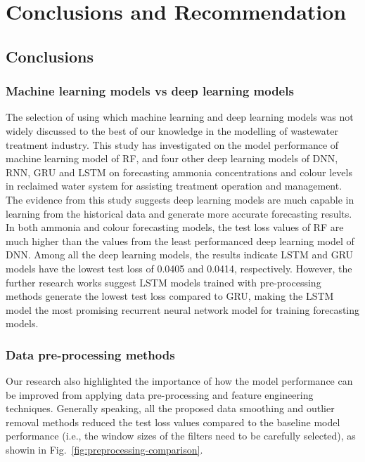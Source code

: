 \chapter{Conclusions and Recommendation}
\section{Conclusions}
\subsection{Machine learning models vs deep learning models}
The selection of using which machine learning and deep learning models was not widely discussed to the best of our knowledge in the modelling of wastewater treatment industry. This study has investigated on the model performance of machine learning model of RF, and four other deep learning models of DNN, RNN, GRU and LSTM on forecasting ammonia concentrations and colour levels in reclaimed water system for assisting treatment operation and management. The evidence from this study suggests deep learning models are much capable in learning from the historical data and generate more accurate forecasting results. In both ammonia and colour forecasting models, the test loss values of RF are much higher than the values from the least performanced deep learning model of DNN. Among all the deep learning models, the results indicate LSTM and GRU models have the lowest test loss of 0.0405 and 0.0414, respectively. However, the further research works suggest LSTM models trained with pre-processing methods generate the lowest test loss compared to GRU, making the LSTM model the most promising recurrent neural network model for training forecasting models.

\subsection{Data pre-processing methods}
Our research also highlighted the importance of how the model performance can be improved from applying data pre-processing and feature engineering techniques. Generally speaking, all the proposed data smoothing and outlier removal methods reduced the test loss values compared to the baseline model performance (i.e., the window sizes of the filters need to be carefully selected), as showin in Fig.~\ref{fig:preprocessing-comparison}.


